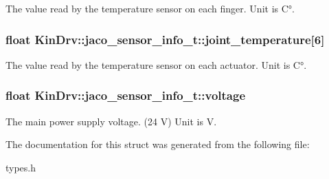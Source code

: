 The value read by the temperature sensor on each finger. Unit is C°. \hypertarget{structKinDrv_1_1jaco__sensor__info__t_a869621af68be9e5dca47b564183d73fd}{
\subsubsection[{joint\+\_\+temperature}]{\setlength{\rightskip}{0pt plus 5cm}float Kin\+Drv\+::jaco\+\_\+sensor\+\_\+info\+\_\+t\+::joint\+\_\+temperature\mbox{[}6\mbox{]}}}\label{structKinDrv_1_1jaco__sensor__info__t_a869621af68be9e5dca47b564183d73fd}
The value read by the temperature sensor on each actuator. Unit is C°. \hypertarget{structKinDrv_1_1jaco__sensor__info__t_a693b9eeab48826e3406c253adc56e5ef}{
\subsubsection[{voltage}]{\setlength{\rightskip}{0pt plus 5cm}float Kin\+Drv\+::jaco\+\_\+sensor\+\_\+info\+\_\+t\+::voltage}}\label{structKinDrv_1_1jaco__sensor__info__t_a693b9eeab48826e3406c253adc56e5ef}
The main power supply voltage. (24 V) Unit is V. 

The documentation for this struct was generated from the following file\+:\begin{DoxyCompactItemize}
\item 
types.\+h\end{DoxyCompactItemize}
